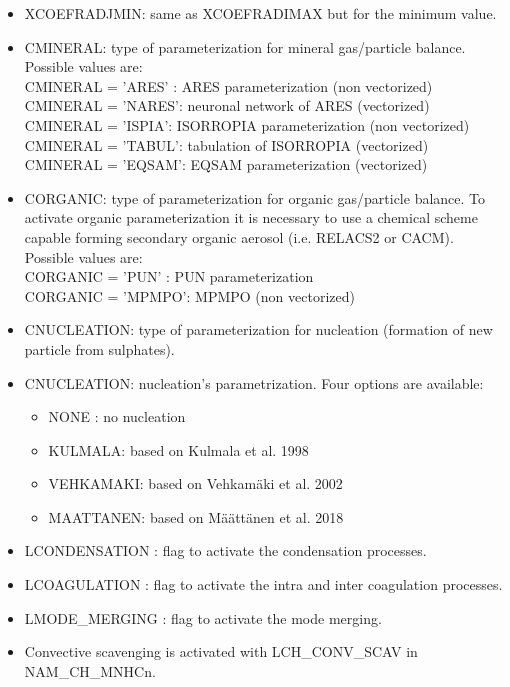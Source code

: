 \begin{itemize}
\item  XCOEFRADJMIN: same as XCOEFRADIMAX but for the minimum value.
\item  CMINERAL: type of parameterization for mineral gas/particle balance. Possible values are:\\
CMINERAL = 'ARES' : ARES parameterization (non vectorized) \\
CMINERAL = 'NARES': neuronal network of ARES (vectorized) \\
CMINERAL = 'ISPIA': ISORROPIA parameterization (non vectorized) \\
CMINERAL = 'TABUL': tabulation of ISORROPIA  (vectorized) \\
CMINERAL = 'EQSAM': EQSAM parameterization (vectorized) 

\item  CORGANIC: type of parameterization for organic gas/particle balance. To activate organic parameterization it is necessary to use a chemical scheme capable forming secondary organic aerosol (i.e. RELACS2 or CACM). Possible values are:\\
CORGANIC = 'PUN' : PUN parameterization  \\
CORGANIC = 'MPMPO': MPMPO (non vectorized) 

\item  CNUCLEATION: type of parameterization for nucleation (formation of new particle from sulphates). 	\item CNUCLEATION: nucleation's parametrization. Four options are available:
\begin{itemize}
\item NONE : no nucleation
\item KULMALA: based on Kulmala et al. 1998
\item VEHKAMAKI: based on Vehkamäki et al. 2002
\item MAATTANEN: based on Määttänen et al. 2018
\end{itemize}
\item LCONDENSATION : flag to activate the condensation processes.
\item LCOAGULATION : flag to activate the intra and inter coagulation processes.
\item LMODE\_MERGING : flag to activate the mode merging.
\item Convective scavenging is activated with LCH\_CONV\_SCAV in NAM\_CH\_MNHCn.

\end{itemize}

